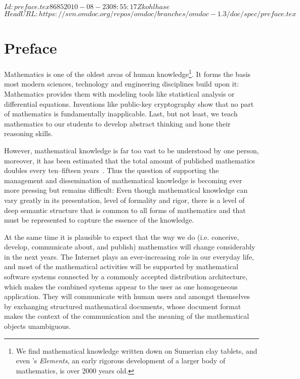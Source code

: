 \svnInfo $Id: preface.tex 8685 2010-08-23 08:55:17Z kohlhase $
\svnKeyword $HeadURL: https://svn.omdoc.org/repos/omdoc/branches/omdoc-1.3/doc/spec/preface.tex $

\section*{Preface}\label{sec:intro}

Mathematics is one of the oldest areas of human knowledge\footnote{We find mathematical
  knowledge written down on Sumerian clay tablets, and even
  {}'s {\emph{Elements}}, an early rigorous
  development of a larger body of mathematics, is over 2000 years old.}.  It forms the
basis most modern sciences, technology and engineering disciplines build upon
it: Mathematics provides them with modeling tools like statistical analysis or
differential equations.  Inventions like public-key cryptography show that no part of
mathematics is fundamentally inapplicable.  Last, but not least, we teach mathematics to
our students to develop abstract thinking and hone their reasoning skills.
  
However, mathematical knowledge is far too vast to be understood by one person, moreover,
it has been estimated that the total amount of published mathematics doubles every
ten--fifteen years~\cite{Odlyzko:tlogr95}. Thus the question of supporting the management
and dissemination of mathematical
knowledge
is becoming ever more pressing but remains difficult: Even though mathematical knowledge
can vary greatly in its presentation, level of formality and rigor, there is a level of
deep semantic structure that is common to all forms of mathematics and that must be
represented to capture the essence of the knowledge.

At the same time it is plausible to expect that the way we do (i.e. conceive, develop,
communicate about, and publish) mathematics will change considerably in the next years.
The Internet plays an ever-increasing role in our everyday life, and most of the
mathematical activities will be supported by mathematical software systems connected by a
commonly accepted distribution architecture, which makes the combined systems appear to the
user as one homogeneous application. They will communicate with human users and amongst
themselves by exchanging structured mathematical documents, whose document format makes
the context of the communication and the meaning of the mathematical objects unambiguous.

